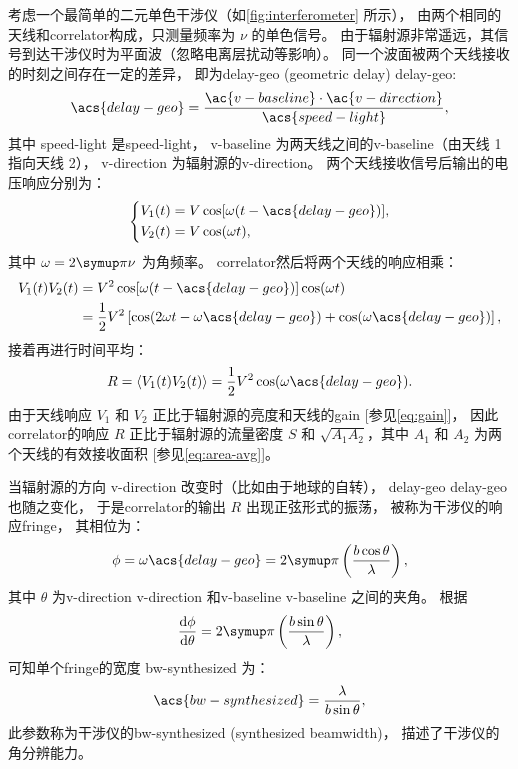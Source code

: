 考虑一个最简单的二元单色干涉仪（如\autoref{fig:interferometer} 所示），
由两个相同的天线和\ac{correlator}构成，只测量频率为 $\nu$ 的单色信号。
由于辐射源非常遥远，其信号到达干涉仪时为平面波（忽略电离层扰动等影响）。
同一个波面被两个天线接收的时刻之间存在一定的差异，
即为\acl{delay-geo} (geometric delay) \ac{delay-geo}:
\begin{equation}
  \acs{delay-geo} =
    \frac{\ac{v-baseline} \cdot \ac{v-direction}}{\acs{speed-light}} ,
\end{equation}
其中 \acs{speed-light} 是\acl{speed-light}，
\ac{v-baseline} 为两天线之间的\acl{v-baseline}（由天线 1 指向天线 2），
\ac{v-direction} 为辐射源的\acl{v-direction}。
两个天线接收信号后输出的电压响应分别为：
\begin{equation}
  \left\{
    \begin{aligned}
      V_1(t) &= V \cos [\omega (t - \acs{delay-geo})] , \\
      V_2(t) &= V \cos (\omega t) ,
    \end{aligned}
  \right.
\end{equation}
其中 $\omega = 2\Cpi\nu$ 为角频率。
\ac{correlator}然后将两个天线的响应相乘：
\begin{align}
  V_1(t) V_2(t)
    &= V^2 \cos [\omega (t - \acs{delay-geo})] \cos (\omega t) \\
    &= \frac{1}{2} V^2 \left[ \cos (2\omega t - \omega \acs{delay-geo})
      + \cos (\omega \acs{delay-geo}) \right] ,
\end{align}
接着再进行时间平均：
\begin{equation}
  \label{eq:resp-corr}
  R = \langle V_1(t) V_2(t) \rangle
    = \frac{1}{2} V^2 \cos (\omega \acs{delay-geo}) .
\end{equation}
由于天线响应 $V_1$ 和 $V_2$ 正比于辐射源的亮度和天线的\ac{gain}
[参见\autoref{eq:gain}]，
因此\ac{correlator}的响应 $R$ 正比于辐射源的流量密度 $S$
和 $\sqrt{A_1 A_2}$，其中 $A_1$ 和 $A_2$ 为两个天线的有效接收面积
[参见\autoref{eq:area-avg}]。

当辐射源的方向 \ac{v-direction} 改变时（比如由于地球的自转），
\acl{delay-geo} \acs{delay-geo} 也随之变化，
于是\ac{correlator}的输出 $R$ 出现正弦形式的振荡，
被称为干涉仪的响应\acf{fringe}，
其相位为：
\begin{equation}
  \phi = \omega \acs{delay-geo}
    = 2\Cpi \left( \frac{b \cos\theta}{\lambda} \right) ,
\end{equation}
其中 $\theta$ 为\acl{v-direction} \ac{v-direction}
和\acl{v-baseline} \ac{v-baseline} 之间的夹角。
根据
\begin{equation}
  \diff{\phi}{\theta}
    = 2\Cpi \left( \frac{b \sin\theta}{\lambda} \right) ,
\end{equation}
可知单个\ac{fringe}的宽度 \acs{bw-synthesized} 为：
\begin{equation}
  \label{eq:bw-synthesized}
  \acs{bw-synthesized} = \frac{\lambda}{b \sin\theta} ,
\end{equation}
此参数称为干涉仪的\acl{bw-synthesized} (synthesized beamwidth)，
描述了干涉仪的角分辨能力。

